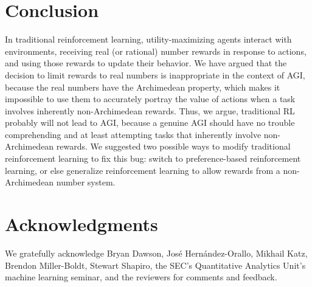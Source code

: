 \documentclass[twoside,11pt]{article}
\begin{document}


\section{Conclusion}
\label{conclusionsection}

In traditional reinforcement learning, utility-maximizing agents interact
with environments, receiving real (or rational) number rewards in response to
actions, and using those rewards to update their behavior. We have argued that
the decision to limit rewards to real numbers is inappropriate in the context
of AGI, because the real numbers have the Archimedean property, which makes it
impossible to use them to accurately portray the value of actions when a task
involves inherently non-Archimedean rewards. Thus, we argue, traditional
RL probably will not lead to AGI, because a genuine AGI should have no trouble
comprehending and at least attempting tasks that inherently involve
non-Archimedean rewards. We suggested two possible ways
to modify traditional reinforcement learning to fix this bug: switch to
preference-based reinforcement learning, or else generalize reinforcement learning
to allow rewards from a non-Archimedean number system.

\section*{Acknowledgments}

We gratefully acknowledge Bryan Dawson, Jos{\'e} Hern{\'a}ndez-Orallo,
Mikhail Katz,
Brendon Miller-Boldt, Stewart Shapiro, the
SEC's Quantitative Analytics Unit's machine learning seminar,
and the reviewers
for comments and feedback.

%

\end{document}
